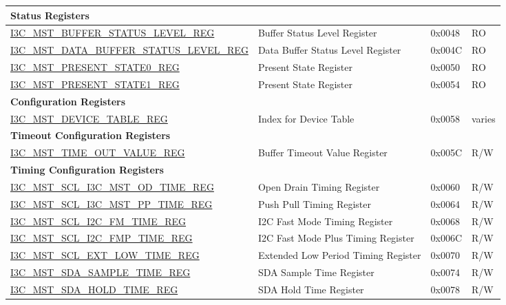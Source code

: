 \begin{longtable}{ | p{7.5cm} | p{6cm} | p{1.3cm} | p{1.5cm} | }
\multicolumn{4}{|l|}{\textbf{Status Registers}} \\ \hline
\hyperref[regdesc:I3CMSTBUFFERSTATUSLEVELREG]{I3C\_MST\_BUFFER\_STATUS\_LEVEL\_REG} & Buffer Status Level Register & 0x0048 & RO \\ \hline
\hyperref[regdesc:I3CMSTDATABUFFERSTATUSLEVELREG]{I3C\_MST\_DATA\_BUFFER\_STATUS\_LEVEL\_REG} & Data Buffer Status Level Register & 0x004C & RO \\ \hline
\hyperref[regdesc:I3CMSTPRESENTSTATE0REG]{I3C\_MST\_PRESENT\_STATE0\_REG} & Present State Register & 0x0050 & RO \\ \hline
\hyperref[regdesc:I3CMSTPRESENTSTATE1REG]{I3C\_MST\_PRESENT\_STATE1\_REG} & Present State Register & 0x0054 & RO \\ \hline
\multicolumn{4}{|l|}{\textbf{Configuration Registers}} \\ \hline
\hyperref[regdesc:I3CMSTDEVICETABLEREG]{I3C\_MST\_DEVICE\_TABLE\_REG} & Index for Device Table & 0x0058 & varies \\ \hline
\multicolumn{4}{|l|}{\textbf{Timeout Configuration Registers}} \\ \hline
\hyperref[regdesc:I3CMSTTIMEOUTVALUEREG]{I3C\_MST\_TIME\_OUT\_VALUE\_REG} & Buffer Timeout Value Register & 0x005C & R/W \\ \hline
\multicolumn{4}{|l|}{\textbf{Timing Configuration Registers}} \\ \hline
\hyperref[regdesc:I3CMSTSCLI3CMSTODTIMEREG]{I3C\_MST\_SCL\_I3C\_MST\_OD\_TIME\_REG} & Open Drain Timing Register & 0x0060 & R/W \\ \hline
\hyperref[regdesc:I3CMSTSCLI3CMSTPPTIMEREG]{I3C\_MST\_SCL\_I3C\_MST\_PP\_TIME\_REG} & Push Pull Timing Register & 0x0064 & R/W \\ \hline
\hyperref[regdesc:I3CMSTSCLI2CFMTIMEREG]{I3C\_MST\_SCL\_I2C\_FM\_TIME\_REG} & I2C Fast Mode Timing Register & 0x0068 & R/W \\ \hline
\hyperref[regdesc:I3CMSTSCLI2CFMPTIMEREG]{I3C\_MST\_SCL\_I2C\_FMP\_TIME\_REG} & I2C Fast Mode Plus Timing Register & 0x006C & R/W \\ \hline
\hyperref[regdesc:I3CMSTSCLEXTLOWTIMEREG]{I3C\_MST\_SCL\_EXT\_LOW\_TIME\_REG} & Extended Low Period Timing Register & 0x0070 & R/W \\ \hline
\hyperref[regdesc:I3CMSTSDASAMPLETIMEREG]{I3C\_MST\_SDA\_SAMPLE\_TIME\_REG} & SDA Sample Time Register & 0x0074 & R/W \\ \hline
\hyperref[regdesc:I3CMSTSDAHOLDTIMEREG]{I3C\_MST\_SDA\_HOLD\_TIME\_REG} & SDA Hold Time Register & 0x0078 & R/W \\ \hline

\end{longtable}
